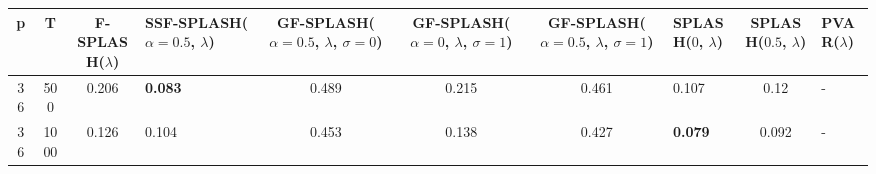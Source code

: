 \begin{tabular}{ccclccclcl}
\hline
  p  &  T   &  F-SPLASH($\lambda$)  & SSF-SPLASH($\alpha=0.5$, $\lambda$)   &  GF-SPLASH($\alpha=0.5$, $\lambda$, $\sigma=0$)  &  GF-SPLASH($\alpha=0$, $\lambda$, $\sigma=1$)  &  GF-SPLASH($\alpha=0.5$, $\lambda$, $\sigma=1$)  & SPLASH($0$, $\lambda$)   &  SPLASH($0.5$, $\lambda$)  & PVAR($\lambda$)   \\
\hline
 36  & 500  &         0.206         & \textbf{0.083}                        &                      0.489                       &                     0.215                      &                      0.461                       & 0.107                    &            0.12            & -                 \\
 36  & 1000 &         0.126         & 0.104                                 &                      0.453                       &                     0.138                      &                      0.427                       & \textbf{0.079}           &           0.092            & -                 \\
\hline
\end{tabular}